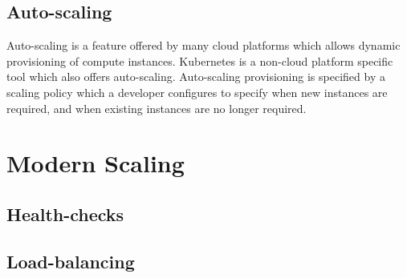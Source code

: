 \subsection{Auto-scaling}
Auto-scaling is a feature offered by many cloud platforms which allows dynamic provisioning of compute instances.
Kubernetes is a non-cloud platform specific tool which also offers auto-scaling.
Auto-scaling provisioning is specified by a scaling policy which a developer configures to specify when new instances are required, and when existing instances are no longer required.


\section{Modern Scaling}

\subsection{Health-checks}


\subsection{Load-balancing}

